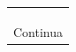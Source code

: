 \begin{table}[H]
\begin{tabular*}{\columnwidth}{@{\extracolsep{\fill}}clcrl}
                                           &                                                                                                            &            &                  &                                                                                                                                                                                                                                                                                                                                                                                                                                                                           \\
                                           &                                                                                                            &            &                  &                                                                                                                                                                                                                                                                                                                                                                                                                                                                           \\
                                           &                                                                                                            &            &                  &                                                                                                                                                                                                                                                                                                                                                                                                                                                                           \\ \hline
    \multicolumn{5}{c}{Continua}                                                                                                                                                                                                                                                                                                                                                                                                                                                                                                                                                                                                                                    \\ \hline
    \end{tabular*}
    \end{table} \pagebreak

